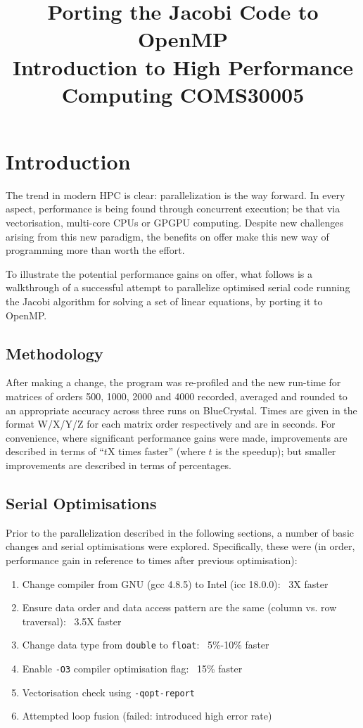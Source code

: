 \documentclass{article}
\begin{document}
\title{Porting the Jacobi Code to OpenMP \\
{\large Introduction to High Performance Computing COMS30005}}
\maketitle

\section{Introduction}
The trend in modern HPC is clear: parallelization is the way
forward. In every aspect, performance is being found through
concurrent execution; be that via vectorisation, multi-core CPUs or
GPGPU computing. Despite new challenges arising from this new
paradigm, the benefits on offer make this new way of programming more
than worth the effort.

To illustrate the potential performance gains on offer, what follows
is a walkthrough of a successful attempt to parallelize optimised
serial code running the Jacobi algorithm for solving a set of linear
equations, by porting it to OpenMP.

\subsection{Methodology} After making a change, the program was
re-profiled and the new run-time for matrices of orders 500, 1000,
2000 and 4000 recorded, averaged and rounded to an appropriate
accuracy across three runs on BlueCrystal. Times are given in the
format W/X/Y/Z for each matrix order respectively and are in
seconds. For convenience, where significant performance gains were
made, improvements are described in terms of ``\(t\)X times faster''
(where \(t\) is the speedup); but smaller improvements are described
in terms of percentages.

\subsection{Serial Optimisations}
Prior to the parallelization described in the following sections, a
number of basic changes and serial optimisations were
explored. Specifically, these were (in order, performance gain in
reference to times after previous optimisation):

\begin{enumerate}
\item Change compiler from GNU (gcc 4.8.5) to Intel (icc 18.0.0): ~3X
  faster
\item Ensure data order and data access pattern are the same (column
  vs. row traversal): ~3.5X faster
\item Change data type from \texttt{double} to \texttt{float}:
  ~5\%-10\% faster
\item Enable \texttt{-O3} compiler optimisation flag: ~15\% faster
\item Vectorisation check using \texttt{-qopt-report}
\item Attempted loop fusion (failed: introduced high error rate)
\end{enumerate}
\end{document}

